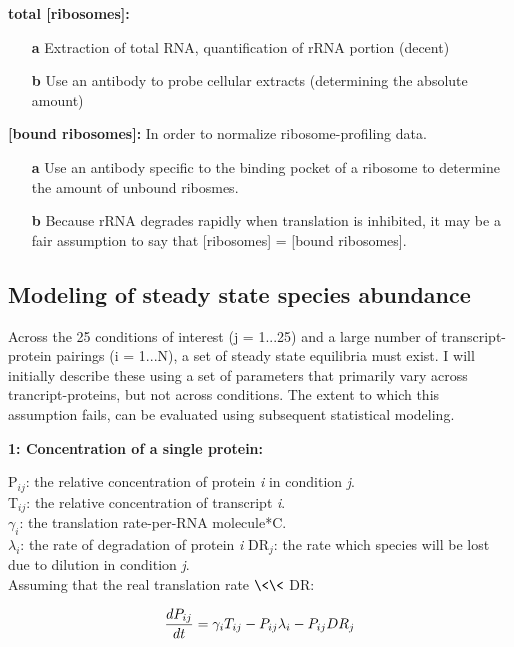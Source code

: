 \documentclass[12pt]{article}
\begin{document}
\textbf{total [ribosomes]:} 

\begin{itemize}
\item[\textbf{a}] Extraction of total RNA, quantification of rRNA portion (decent)
\item[\textbf{b}] Use an antibody to probe cellular extracts (determining the absolute amount) 
\end{itemize}

\textbf{[bound ribosomes]:} In order to normalize ribosome-profiling data.

\begin{itemize}
\item[\textbf{a}] Use an antibody specific to the binding pocket of a ribosome to determine the amount of unbound ribosmes.
\item[\textbf{b}] Because rRNA degrades rapidly when translation is inhibited, it may be a fair assumption to say that [ribosomes] = [bound ribosomes].  
\end{itemize}



\clearpage
\subsection*{Modeling of steady state species abundance}

Across the 25 conditions of interest (j = 1...25) and a large number of transcript-protein pairings (i = 1...N), a set of steady state equilibria must exist.  I will initially describe these using a set of parameters that primarily vary across trancript-proteins, but not across conditions.  The extent to which this assumption fails, can be evaluated using subsequent statistical modeling.

\textbf{1: Concentration of a single protein:}

P$_{ij}$: the relative concentration of protein \textit{i} in condition \textit{j}.\\
T$_{ij}$: the relative concentration of transcript \textit{i}.\\  
$\gamma_{i}$: the translation rate-per-RNA molecule*C.\\
$\lambda_{i}$: the rate of degradation of protein \textit{i}
DR$_{j}$: the rate which species will be lost due to dilution in condition \textit{j}.\\

Assuming that the real translation rate $\<\<$ DR:

\begin{align}
\frac{dP_{ij}}{dt} &= \gamma_{i}T_{ij} - P_{ij}\lambda_{i} - P_{ij}DR_{j}\notag\\
\label{prot}
\end{align}
\end{document}
